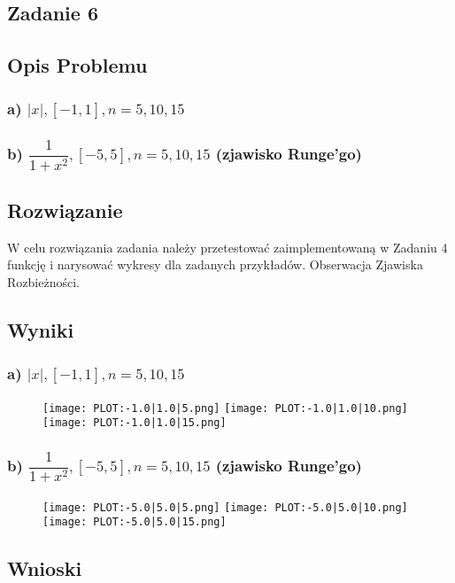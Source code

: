\documentclass[11pt]{article}
\begin{document}
\begin{flushleft}
\newpage
\section{Zadanie 6}
\subsection{Opis Problemu}
\subsubsection{a) $|x|,[−1,1],n= 5,10,15$}
\subsubsection{b) $\dfrac{1}{1+x^2},[−5,5],n= 5,10,15 $ (zjawisko  Runge’go)}
\subsection{Rozwiązanie}
W celu rozwiązania zadania należy przetestować zaimplementowaną w Zadaniu 4 funkcję i narysować wykresy dla zadanych przykładów. Obserwacja Zjawiska Rozbieżności.
\subsection{Wyniki}
\subsubsection{a) $|x|,[−1,1],n= 5,10,15$}
\begin{figure}[htbp]
\centering
\texttt{[image: PLOT:-1.0|1.0|5.png]}
\texttt{[image: PLOT:-1.0|1.0|10.png]}
\texttt{[image: PLOT:-1.0|1.0|15.png]}
\end{figure}
\newpage
\subsubsection{b) $\dfrac{1}{1+x^2},[−5,5],n= 5,10,15 $ (zjawisko  Runge’go)}
\begin{figure}[htbp]
\centering
\texttt{[image: PLOT:-5.0|5.0|5.png]}
\texttt{[image: PLOT:-5.0|5.0|10.png]}
\texttt{[image: PLOT:-5.0|5.0|15.png]}
\end{figure}
\newpage
\subsection{Wnioski}

\end{flushleft}
\end{document}
